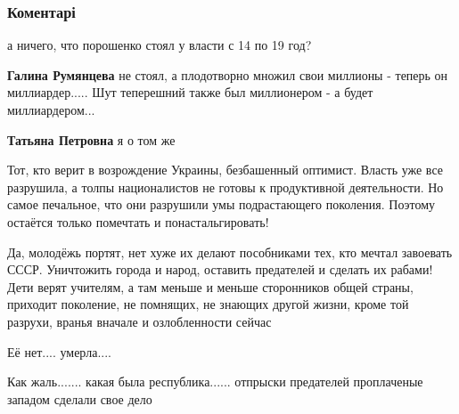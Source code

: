  
 
 
 
 
\subsubsection{Коментарі}

\begin{itemize} %
а ничего, что порошенко стоял у власти с 14 по 19 год?

\begin{itemize} %
\textbf{Галина Румянцева} не стоял, а плодотворно множил свои миллионы - теперь он миллиардер..... Шут теперешний также был миллионером - а будет миллиардером...

\textbf{Татьяна Петровна} я о том же
\end{itemize} %


Тот, кто верит в возрождение Украины, безбашенный оптимист. Власть уже все
разрушила, а толпы националистов не готовы к продуктивной деятельности. Но самое
печальное, что они разрушили умы подрастающего поколения. Поэтому остаётся только
помечтать и понастальгировать!


Да, молодёжь портят, нет хуже их делают пособниками тех, кто мечтал завоевать
СССР. Уничтожить города и народ, оставить предателей и сделать их рабами! Дети
верят учителям, а там меньше и меньше сторонников общей страны, приходит
поколение, не помнящих, не знающих другой жизни, кроме той разрухи, вранья
вначале и озлобленности сейчас

Её нет.... умерла....


Как жаль....... какая была республика...... отпрыски предателей проплаченые
западом сделали свое дело

\end{itemize} %
